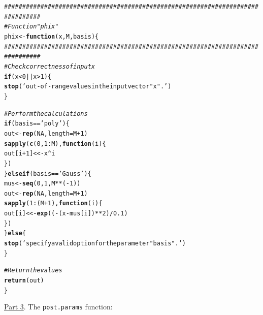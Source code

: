 \documentclass[a4paper, 11pt]{article}\usepackage[]{graphicx}\usepackage[]{color}
\makeatletter
\newcommand{\hlnum}[1]{\textcolor[rgb]{0.686,0.059,0.569}{#1}}%
\newcommand{\hlstr}[1]{\textcolor[rgb]{0.192,0.494,0.8}{#1}}%
\newcommand{\hlcom}[1]{\textcolor[rgb]{0.678,0.584,0.686}{\textit{#1}}}%
\newcommand{\hlopt}[1]{\textcolor[rgb]{0,0,0}{#1}}%
\newcommand{\hlstd}[1]{\textcolor[rgb]{0.345,0.345,0.345}{#1}}%
\newcommand{\hlkwa}[1]{\textcolor[rgb]{0.161,0.373,0.58}{\textbf{#1}}}%
\newcommand{\hlkwb}[1]{\textcolor[rgb]{0.69,0.353,0.396}{#1}}%
\newcommand{\hlkwc}[1]{\textcolor[rgb]{0.333,0.667,0.333}{#1}}%
\newcommand{\hlkwd}[1]{\textcolor[rgb]{0.737,0.353,0.396}{\textbf{#1}}}%
\newenvironment{kframe}{%
 \def\at@end@of@kframe{}%
 \ifinner\ifhmode%
  \def\at@end@of@kframe{\end{minipage}}%
  \begin{minipage}{\columnwidth}%
 \fi\fi%
 \def\FrameCommand##1{\hskip\@totalleftmargin \hskip-\fboxsep
 \colorbox{shadecolor}{##1}\hskip-\fboxsep
     \hskip-\linewidth \hskip-\@totalleftmargin \hskip\columnwidth}%
 \MakeFramed {\advance\hsize-\width
   \@totalleftmargin\z@ \linewidth\hsize
   \@setminipage}}%
 {\par\unskip\endMakeFramed%
 \at@end@of@kframe}
\newenvironment{knitrout}{}{} %
\makeatother
\begin{document}
\begin{knitrout}\small
{}\color{fgcolor}\begin{kframe}
\begin{alltt}
\hlcom{################################################################################}
\hlcom{# Function "phix"}
\hlstd{phix} \hlkwb{<-} \hlkwa{function}\hlstd{(}\hlkwc{x}\hlstd{,} \hlkwc{M}\hlstd{,} \hlkwc{basis}\hlstd{) \{}
\hlcom{################################################################################}
  \hlcom{# Check correctness of input x}
  \hlkwa{if} \hlstd{(x} \hlopt{<} \hlnum{0} \hlopt{||} \hlstd{x} \hlopt{>} \hlnum{1}\hlstd{) \{}
    \hlkwd{stop}\hlstd{(}\hlstr{'out-of-range values in the input vector "x".'}\hlstd{)}
  \hlstd{\}}

  \hlcom{# Perform the calculations  }
  \hlkwa{if} \hlstd{(basis} \hlopt{==} \hlstr{'poly'}\hlstd{) \{}
    \hlstd{out} \hlkwb{<-} \hlkwd{rep}\hlstd{(}\hlnum{NA}\hlstd{,} \hlkwc{length} \hlstd{= M} \hlopt{+} \hlnum{1}\hlstd{)}
    \hlkwd{sapply}\hlstd{(}\hlkwd{c}\hlstd{(}\hlnum{0}\hlstd{,} \hlnum{1}\hlopt{:}\hlstd{M),} \hlkwa{function}\hlstd{(}\hlkwc{i}\hlstd{) \{}
      \hlstd{out[i} \hlopt{+} \hlnum{1}\hlstd{]} \hlkwb{<<-} \hlstd{x}\hlopt{^}\hlstd{i}
    \hlstd{\})}
  \hlstd{\}} \hlkwa{else if} \hlstd{(basis} \hlopt{==} \hlstr{'Gauss'}\hlstd{) \{}
    \hlstd{mus} \hlkwb{<-} \hlkwd{seq}\hlstd{(}\hlnum{0}\hlstd{,} \hlnum{1}\hlstd{, M} \hlopt{**} \hlstd{(}\hlopt{-}\hlnum{1}\hlstd{))}
    \hlstd{out} \hlkwb{<-} \hlkwd{rep}\hlstd{(}\hlnum{NA}\hlstd{,} \hlkwc{length} \hlstd{= M} \hlopt{+} \hlnum{1}\hlstd{)}
    \hlkwd{sapply}\hlstd{(}\hlnum{1}\hlopt{:}\hlstd{(M} \hlopt{+} \hlnum{1}\hlstd{),} \hlkwa{function}\hlstd{(}\hlkwc{i}\hlstd{) \{}
      \hlstd{out[i]} \hlkwb{<<-} \hlkwd{exp}\hlstd{((}\hlopt{-}\hlstd{(x} \hlopt{-} \hlstd{mus[i])} \hlopt{**} \hlnum{2}\hlstd{)} \hlopt{/} \hlnum{0.1}\hlstd{)}
    \hlstd{\})}
  \hlstd{\}} \hlkwa{else} \hlstd{\{}
    \hlkwd{stop}\hlstd{(}\hlstr{'specify a valid option for the parameter "basis".'}\hlstd{)}
  \hlstd{\}}

  \hlcom{# Return the values}
  \hlkwd{return}\hlstd{(out)}
\hlstd{\}}
\end{alltt}
\end{kframe}
\end{knitrout}
\underline{Part 3}. The \texttt{post.params} function:
\end{document}
